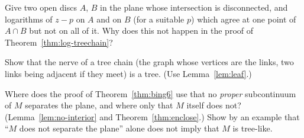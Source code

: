 \begin{exercise}
Give two open discs $A$, $B$ in the plane whose intersection is disconnected, and logarithms of $z-p$
on $A$ and on $B$ (for a suitable $p$) which agree at one point of $A\cap B$ but not on all of it. Why
does this not happen in the proof of Theorem~\ref{thm:log-treechain}?
\end{exercise}

\begin{exercise}
Show that the nerve of a tree chain (the graph whose vertices are the links, two links being adjacent
if they meet) is a tree. (Use Lemma~\ref{lem:leaf}.)
\end{exercise}

\begin{exercise}
Where does the proof of Theorem~\ref{thm:bing6} use that no \emph{proper} subcontinuum of $M$ separates
the plane, and where only that $M$ itself does not? (Lemma~\ref{lem:no-interior} and
Theorem~\ref{thm:enclose}.) Show by an example that ``$M$ does not separate the plane'' alone does not
imply that $M$ is tree-like.
\end{exercise}

